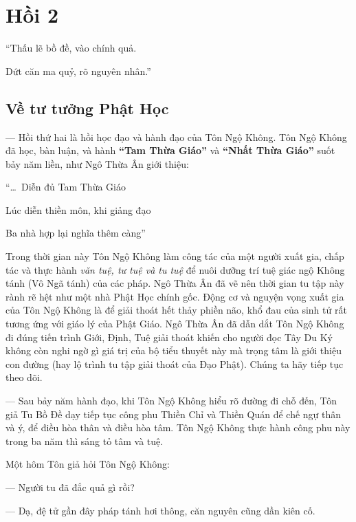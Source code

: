 \chapter{Hồi 2} %
\label{cha:hoi_2}


\begin{itshape}
``Thấu lẽ bồ đề, vào chính quả.

Dứt căn ma quỷ, rõ nguyên nhân.''
\end{itshape}

\section{Về tư tưởng Phật Học} %
\label{sec:2_tu_tuong_phat_hoc}

— Hồi thứ hai là hồi học đạo và hành đạo của Tôn Ngộ Không. Tôn Ngộ Không đã học, bàn luận, và hành {\bf ``Tam Thừa Giáo''} và {\bf ``Nhất Thừa Giáo''} suốt bảy năm liền, như Ngô Thừa Ân giới thiệu:

\begin{itshape}
``\ldots ~Diễn đủ Tam Thừa Giáo

Lúc diễn thiền môn, khi giảng đạo

Ba nhà hợp lại nghĩa thêm càng''
\end{itshape}

Trong thời gian này Tôn Ngộ Không làm công tác của một người xuất gia, chấp tác và thực hành \emph{văn tuệ, tư tuệ và tu tuệ} để nuôi dưỡng trí tuệ giác ngộ Không tánh (Vô Ngã tánh) của các pháp. Ngô Thừa Ân đã vẽ nên thời gian tu tập này rành rẽ hệt như một nhà Phật Học chính gốc. Động cơ và nguyện vọng xuất gia của Tôn Ngộ Không là để giải thoát hết thảy phiền não, khổ đau của sinh tử rất tương ứng với giáo lý của Phật Giáo. Ngô Thừa Ân đã dẫn dắt Tôn Ngộ Không đi đúng tiến trình Giới, Định, Tuệ giải thoát khiến cho người đọc Tây Du Ký không còn nghi ngờ gì giá trị của bộ tiểu thuyết này mà trọng tâm là giới thiệu con đường (hay lộ trình tu tập giải thoát của Đạo Phật). Chúng ta hãy tiếp tục theo dõi.

— Sau bảy năm hành đạo, khi Tôn Ngộ Không hiểu rõ đường đi chỗ đến, Tôn giả Tu Bồ Đề dạy tiếp tục công phu Thiền Chỉ và Thiền Quán để chế ngự thân và ý, để điều hòa thân và điều hòa tâm. Tôn Ngộ Không thực hành công phu này trong ba năm thì sáng tỏ tâm và tuệ.

Một hôm Tôn giả hỏi Tôn Ngộ Không:

— Người tu đã đắc quả gì rồi?

— Dạ, đệ tử gần đây pháp tánh hơi thông, căn nguyên cũng dần kiên cố.

